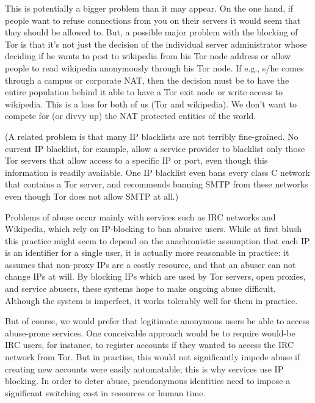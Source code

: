 \documentclass{llncs}
\begin{document}
This is potentially a bigger problem than it may appear. 
On the one hand, if people want to refuse connections from you on
their servers it would seem that they should be allowed to.  But, a
possible major problem with the blocking of Tor is that it's not just
the decision of the individual server administrator whose deciding if
he wants to post to wikipedia from his Tor node address or allow
people to read wikipedia anonymously through his Tor node. If e.g.,
s/he comes through a campus or corporate NAT, then the decision must
be to have the entire population behind it able to have a Tor exit
node or write access to wikipedia. This is a loss for both of us (Tor
and wikipedia). We don't want to compete for (or divvy up) the NAT
protected entities of the world.

(A related problem is that many IP blacklists are not terribly fine-grained.
No current IP blacklist, for example, allow a service provider to blacklist
only those Tor servers that allow access to a specific IP or port, even
though this information is readily available.  One IP blacklist even bans
every class C network that contains a Tor server, and recommends banning SMTP
from these networks even though Tor does not allow SMTP at all.)

Problems of abuse occur mainly with services such as IRC networks and
Wikipedia, which rely on IP-blocking to ban abusive users.  While at first
blush this practice might seem to depend on the anachronistic assumption that
each IP is an identifier for a single user, it is actually more reasonable in
practice: it assumes that non-proxy IPs are a costly resource, and that an
abuser can not change IPs at will.  By blocking IPs which are used by Tor
servers, open proxies, and service abusers, these systems hope to make
ongoing abuse difficult.  Although the system is imperfect, it works
tolerably well for them in practice.

But of course, we would prefer that legitimate anonymous users be able to
access abuse-prone services.  One conceivable approach would be to require
would-be IRC users, for instance, to register accounts if they wanted to
access the IRC network from Tor.  But in practise, this would not
significantly impede abuse if creating new accounts were easily automatable;
this is why services use IP blocking.  In order to deter abuse, pseudonymous
identities need to impose a significant switching cost in resources or human
time.
\end{document}
